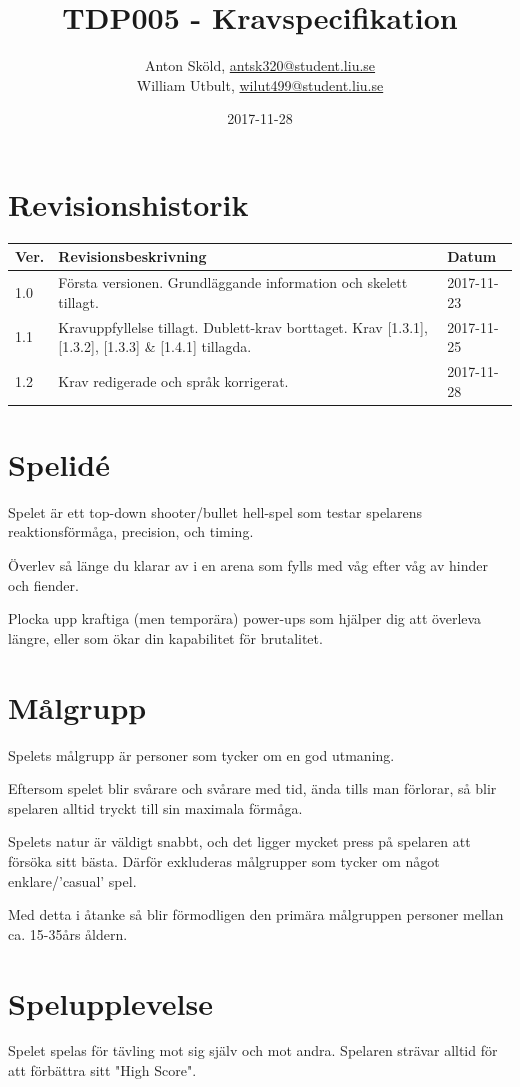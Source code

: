 \documentclass{TDP005mall}
\author{Anton Sköld, \url{antsk320@student.liu.se}\\
  William Utbult, \url{wilut499@student.liu.se}}
\title{TDP005 - Kravspecifikation}
\date{2017-11-28}
\begin{document}
\projectpage
\section{Revisionshistorik}
\begin{table}[!h]
\begin{tabularx}{\linewidth}{|l|X|l|}
\hline
Ver. & Revisionsbeskrivning & Datum \\\hline
	1.0 & Första versionen. Grundläggande information och skelett tillagt. & 2017-11-23 \\\hline
    1.1 & Kravuppfyllelse tillagt. Dublett-krav borttaget. Krav [1.3.1], [1.3.2], [1.3.3] \& [1.4.1] tillagda. & 2017-11-25 \\\hline
    1.2 & Krav redigerade och språk korrigerat. & 2017-11-28 \\\hline
\end{tabularx}
\end{table}


\section{Spelidé}
Spelet är ett top-down shooter/bullet hell-spel som testar spelarens reaktionsförmåga, precision, och timing.

Överlev så länge du klarar av i en arena som fylls med våg efter våg av hinder och fiender.

Plocka upp kraftiga (men temporära) power-ups som hjälper dig att överleva längre, eller som ökar din kapabilitet för brutalitet.

\section{Målgrupp}
Spelets målgrupp är personer som tycker om en god utmaning.

Eftersom spelet blir svårare och svårare med tid, ända tills man förlorar, så blir spelaren alltid tryckt till sin maximala förmåga.

Spelets natur är väldigt snabbt, och det ligger mycket press på spelaren att försöka sitt bästa. Därför exkluderas målgrupper som tycker om något enklare/'casual' spel.

Med detta i åtanke så blir förmodligen den primära målgruppen personer mellan ca. 15-35års åldern.

\section{Spelupplevelse}
Spelet spelas för tävling mot sig själv och mot andra. Spelaren strävar alltid för att förbättra sitt "High Score".
\end{document}
